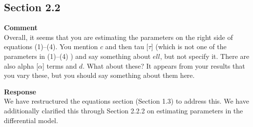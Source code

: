 \subsection{Section 2.2}
\setcounter{rev2-2.2}{1}

\textbf{Comment } \\
Overall, it seems that you are estimating the parameters on the right side of equations (1)--(4).
You mention $ c $ and then tau [$ \tau $] (which is not one of the parameters in (1)--(4) ) and say something about $ ell $, but not specify it.
There are also alpha [$ \alpha $] terms and $ d $.
What about these?
It appears from your results that you vary these, but you should say something about them here.

\textbf{Response } \\
We have restructured the equations section (Section 1.3) to address this.
We have additionally clarified this through Section 2.2.2 on estimating parameters in the differential model.
